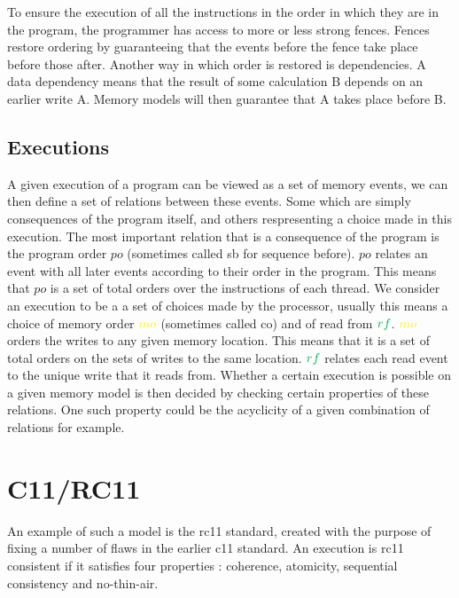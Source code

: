 \documentclass[a4,12pt]{article}
\newcommand{\mo}{{\color{Yellow}mo}}
\newcommand{\po}{po}
\newcommand{\rf}{{\color{Green}rf}}
\begin{document}
To ensure the execution of all the instructions in the order in which they are in the program, the programmer has access to more or less strong fences. Fences restore ordering by guaranteeing that the events before the fence take place before those after. Another way in which order is restored is dependencies. A data dependency means that the result of some calculation B depends on an earlier write A. Memory models will then guarantee that A takes place before B.%

\subsection{Executions}

A given execution of a program can be viewed as a set of memory events, we can then define a set of relations between these events. Some which are simply consequences of the program itself, and others respresenting a choice made in this execution. The most important relation that is a consequence of the program is the program order $\po$ (sometimes called sb for sequence before). $\po$ relates an event with all later events according to their order in the program. This means that $\po$ is a set of total orders over the instructions of each thread. We consider an execution to be a a set of choices made by the processor, usually this means a choice of memory order $\mo$ (sometimes called co) and of read from $\rf$. $\mo$ orders the writes to any given memory location. This means that it is a set of total orders on the sets of writes to the same location. $\rf$ relates each read event to the unique write that it reads from. Whether a certain execution is possible on a given memory model is then decided by checking certain properties of these relations. One such property could be the acyclicity of a given combination of relations for example.

\section{C11/RC11}

An example of such a model is the rc11 standard, created with the purpose of fixing a number of flaws in the earlier c11 standard. An execution is rc11 consistent if it satisfies four properties : coherence, atomicity, sequential consistency and no-thin-air. 
\end{document}
